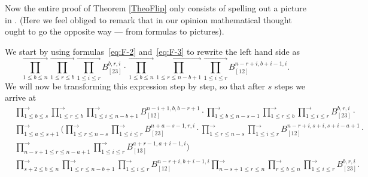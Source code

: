 \documentclass[11pt, reqno]{amsart}
\theoremstyle{definition}
\numberwithin{equation}{section}
\def\longra{\longrightarrow}
\def\le{\leqslant}
\begin{document}
Now the entire proof of Theorem \ref{TheoFlip} only consists of spelling out a picture in \cite{DGG16}. (Here we feel obliged to remark that in our opinion mathematical thought ought to go the opposite way --- from formulas to pictures).

We start by using formulas~\eqref{eq:F-2} and~\eqref{eq:F-3} to rewrite the left hand side as
$$
\prod_{1 \le b \le n}^{\longra} \prod_{1 \le r \le b}^{\longra} \prod_{1 \le i \le r}^{\longra} B_{[23]}^{b,r,i} \cdot \prod_{1 \le b \le n}^{\longra} \prod_{1 \le r \le n-b+1}^{\longra} \prod_{1 \le i \le r}^{\longra} B_{[12]}^{n-r+i,b+i-1,i}.
$$
We will now be transforming this expression step by step, so that after $s$ steps we arrive at
\begin{align*}
&\prod_{1 \le b \le s}^{\longra} \prod_{1 \le r \le b}^{\longra} \prod_{1 \le i \le n-b+1}^{\longra} B_{[12]}^{n-i+1,b,b-r+1} \cdot \prod_{1 \le b \le n-s-1}^{\longra} \prod_{1 \le r \le b}^{\longra} \prod_{1 \le i \le r}^{\longra} B_{[23]}^{b,r,i} \cdot \\
&\prod_{1\le a \le s+1}^{\longra} \Bigg( \prod_{1 \le r \le n-s}^{\longra} \prod_{1 \le i \le r}^{\longra} B_{[23]}^{n+a-s-1,r,i} \cdot
\prod_{1 \le r \le n-s}^{\longra} \prod_{1 \le i \le r}^{\longra} B_{[12]}^{n-r+i,s+i,s+i-a+1} \cdot \\
&\prod_{n-s+1 \le r \le n-a+1}^{\longra} \prod_{1 \le i \le r}^{\longra} B_{[13]}^{a+r-1,a+i-1,i} \Bigg) \\
&\prod_{s+2 \le b \le n}^{\longra} \prod_{1 \le r \le n-b+1}^{\longra} \prod_{1 \le i \le r}^{\longra} B_{[12]}^{n-r+i,b+i-1,i} \prod_{n-s+1 \le r \le n}^{\longra} \prod_{r \le b \le n}^{\longra} \prod_{1 \le i \le r}^{\longra} B_{[23]}^{b,r,i}.
\end{align*}
\end{document}
